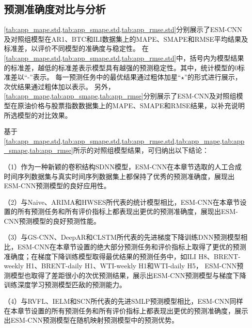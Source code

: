 \subsection{预测准确度对比与分析}

\cref{tab:app_mape.std,tab:app_smape.std,tab:app_rmse.std}分别展示了ESM-CNN及对照组模型在AR1、BTC和ILI数据集上的MAPE、SMAPE和RMSE平均结果及标准差，以评价不同模型的准确度与稳定性。
在\cref{tab:app_mape.std,tab:app_smape.std,tab:app_rmse.std}中，括号内为模型结果的标准差，越低的标准差表示模型具有越强的预测稳定性。其中，统计模型的0标准差以“-”表示。
每一预测任务中的最优结果通过粗体加星“\(\star\)”的形式进行展示，次优结果通过粗体加以表示。
另外，\cref{tab:app_mape,tab:app_smape,tab:app_rmse}分别展示了ESM-CNN及对照组模型在原油价格与股票指数数据集上的MAPE、SMAPE和RMSE结果，以补充说明所选模型的对比效果。








基于\cref{tab:app_mape.std,tab:app_smape.std,tab:app_rmse.std,tab:app_mape,tab:app_smape,tab:app_rmse}所示的对照组模型结果，可归纳出以下结论：

（1）作为一种新颖的卷积结构SDNN模型，ESM-CNN在本章节选取的人工合成时间序列数据集与真实时间序列数据集上都保持了优秀的预测准确度，展现出ESM-CNN预测模型的良好应用性。

（2）与Naive、ARIMA和HWSES所代表的统计模型相比，ESM-CNN在本章节设置的所有预测任务和所有评价指标上都表现出更优的预测准确度，展现出ESM-CNN预测模型的良好预测性能。

（3）与GS-CNN、DeepAR和CLSTM所代表的先进梯度下降训练DNN预测模型相比，ESM-CNN在本章节设置的绝大部分预测任务和评价指标上取得了更优的预测准确度；在梯度下降训练模型取得最优结果的预测任务中，如ILI H8、BRENT-weekly H1、BRENT-daily H1、WTI-weekly H1和WTI-daily H5， ESM-CNN预测模型也取得了差距很小的次优预测结果，展示出ESM-CNN预测模型与梯度下降训练深度学习预测模型匹敌的预测能力。

（4）与RVFL、IELM和SCN所代表的先进SMLP预测模型相比，ESM-CNN同样在本章节设置的所有预测任务和所有评价指标上都表现出更优的预测准确度，展示出ESM-CNN预测模型在随机映射预测模型中的预测优势。


